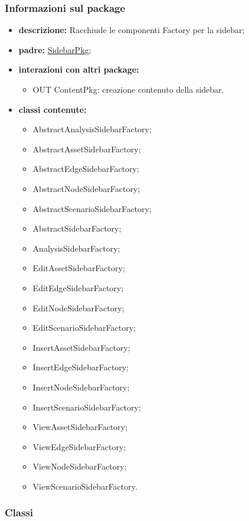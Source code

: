 \subsubsection{Informazioni sul package}
\begin{itemize}
	\item \textbf{descrizione:} Racchiude le componenti Factory per la sidebar;
	\item \textbf{padre:} \hyperref[pkg::SidebarPkg]{SidebarPkg};
	\item \textbf{interazioni con altri package:} 
	\begin{itemize}
		\item OUT ContentPkg: creazione contenuto della sidebar.
	\end{itemize}
	\item \textbf{classi contenute:}
	\begin{itemize}
		\item AbstractAnalysisSidebarFactory;
		\item AbstractAssetSidebarFactory;
		\item AbstractEdgeSidebarFactory;
		\item AbstractNodeSidebarFactory;
		\item AbstractScenarioSidebarFactory;
		\item AbstractSidebarFactory;
		\item AnalysisSidebarFactory;
		\item EditAssetSidebarFactory;
		\item EditEdgeSidebarFactory;
		\item EditNodeSidebarFactory;
		\item EditScenarioSidebarFactory;
		\item InsertAssetSidebarFactory;
		\item InsertEdgeSidebarFactory;
		\item InsertNodeSidebarFactory;
		\item InsertScenarioSidebarFactory;
		\item ViewAssetSidebarFactory;
		\item ViewEdgeSidebarFactory;
		\item ViewNodeSidebarFactory;
		\item ViewScenarioSidebarFactory.
	\end{itemize}
\end{itemize}
\subsubsection{Classi}
